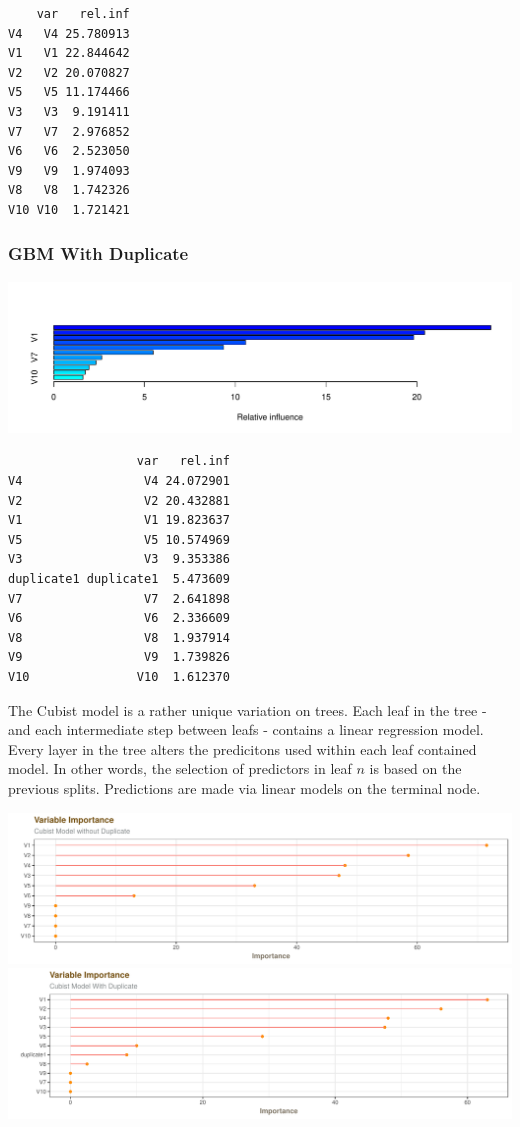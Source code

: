 \documentclass[]{report}
\begin{document}
\begin{verbatim}
    var   rel.inf
V4   V4 25.780913
V1   V1 22.844642
V2   V2 20.070827
V5   V5 11.174466
V3   V3  9.191411
V7   V7  2.976852
V6   V6  2.523050
V9   V9  1.974093
V8   V8  1.742326
V10 V10  1.721421
\end{verbatim}

\subsubsection{GBM With Duplicate}\label{gbm-with-duplicate}

\includegraphics{AppliedPredictiveModeling_treebased_regression_files/figure-latex/kj-8.1da-1.pdf}

\begin{verbatim}
                  var   rel.inf
V4                 V4 24.072901
V2                 V2 20.432881
V1                 V1 19.823637
V5                 V5 10.574969
V3                 V3  9.353386
duplicate1 duplicate1  5.473609
V7                 V7  2.641898
V6                 V6  2.336609
V8                 V8  1.937914
V9                 V9  1.739826
V10               V10  1.612370
\end{verbatim}

The Cubist model is a rather unique variation on trees. Each leaf in the
tree - and each intermediate step between leafs - contains a linear
regression model. Every layer in the tree alters the predicitons used
within each leaf contained model. In other words, the selection of
predictors in leaf \(n\) is based on the previous splits. Predictions
are made via linear models on the terminal node.

\includegraphics{AppliedPredictiveModeling_treebased_regression_files/figure-latex/kj-8.1db-1.pdf}
\includegraphics{AppliedPredictiveModeling_treebased_regression_files/figure-latex/kj-8.1db-2.pdf}
\end{document}

